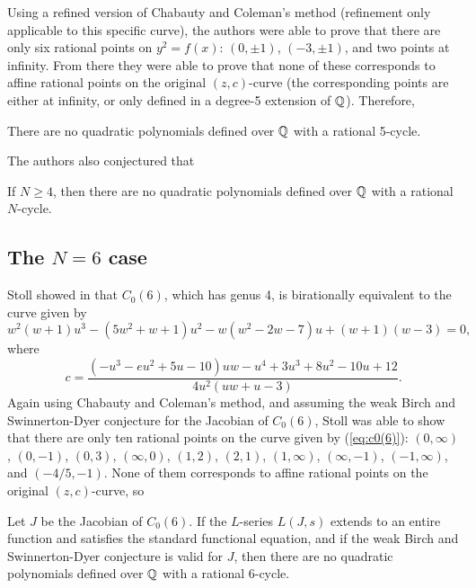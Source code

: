 Using a refined version of Chabauty and Coleman's method (refinement
only applicable to this specific curve), the authors were able to
prove that there are only six rational points on $y^2 = f(x)$: $(0,
\pm 1)$, $(-3, \pm 1)$, and two points at infinity. From there they
were able to prove that none of these corresponds to affine rational
points on the original $(z, c)$-curve (the corresponding points are
either at infinity, or only defined in a degree-5 extension of $\mathbb{Q}$).
Therefore,

\begin{theorem}
  There are no quadratic polynomials defined over $\mathbb{Q}$ with a rational
  5-cycle.
\end{theorem}

The authors also conjectured that

\begin{conjecture}
  If $N \ge 4$, then there are no quadratic polynomials defined over
  $\mathbb{Q}$ with a rational $N$-cycle.
\end{conjecture}

\subsection{The $N = 6$ case}

Stoll showed in \cite{MR2465796} that $C_0(6)$, which has genus 4, is
birationally equivalent to the curve given by
\begin{equation}
  \label{eq:c0(6)}
  w^2(w+1)u^3 - (5w^2+w+1)u^2 - w(w^2-2w-7)u + (w+1)(w-3) = 0,
\end{equation}
where
\begin{equation}
  \label{eq:c-in-uw}
  c = \frac{(-u^3-eu^2+5u-10)uw - u^4 + 3u^3 + 8u^2 - 10u +
    12}{4u^2(uw+u-3)}.
\end{equation}
Again using Chabauty and Coleman's method, and assuming the weak Birch
and Swinnerton-Dyer conjecture for the Jacobian of $C_0(6)$, Stoll was
able to show that there are only ten rational points on the curve
given by (\ref{eq:c0(6)}): $(0, \infty)$, $(0, -1)$, $(0, 3)$,
$(\infty, 0)$, $(1, 2)$, $(2, 1)$, $(1, \infty)$, $(\infty, -1)$,
$(-1, \infty)$, and $(-4/5, -1)$. None of them corresponds to affine
rational points on the original $(z, c)$-curve, so

\begin{theorem}
  Let $J$ be the Jacobian of $C_0(6)$. If the $L$-series $L(J,s)$
  extends to an entire function and satisfies the standard functional
  equation, and if the weak Birch and Swinnerton-Dyer conjecture is
  valid for $J$, then there are no quadratic polynomials defined over
  $\mathbb{Q}$ with a rational 6-cycle.
\end{theorem}


